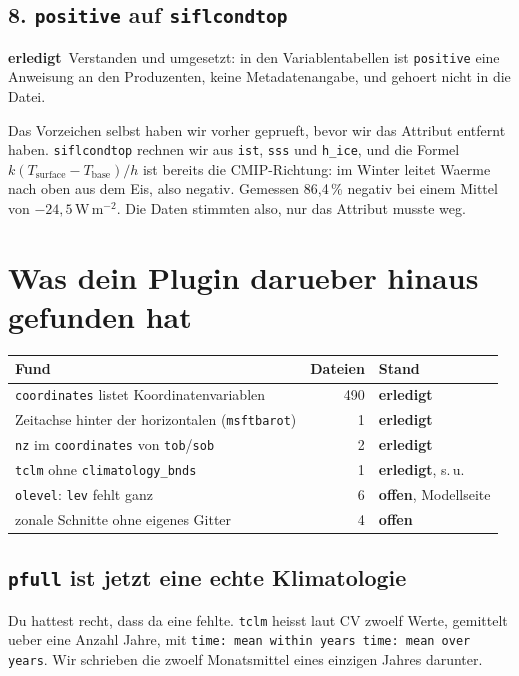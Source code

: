 \documentclass[11pt,a4paper]{article}
\newcommand{\code}[1]{\texttt{\small #1}}
\newcommand{\ok}{\textcolor{green!45!black}{\textbf{erledigt}}}
\newcommand{\offen}{\textcolor{orange!75!black}{\textbf{offen}}}
\begin{document}
\subsection*{8. \code{positive} auf \code{siflcondtop}}
\ok\ Verstanden und umgesetzt: in den Variablentabellen ist \code{positive} eine
Anweisung an den Produzenten, keine Metadatenangabe, und gehoert nicht in die Datei.

Das Vorzeichen selbst haben wir vorher geprueft, bevor wir das Attribut entfernt
haben. \code{siflcondtop} rechnen wir aus \code{ist}, \code{sss} und \code{h\_ice},
und die Formel $k(T_\mathrm{surface} - T_\mathrm{base})/h$ ist bereits die
CMIP-Richtung: im Winter leitet Waerme nach oben aus dem Eis, also negativ. Gemessen
86{,}4\,\% negativ bei einem Mittel von $-24{,}5$\,W\,m$^{-2}$. Die Daten stimmten
also, nur das Attribut musste weg.

\section{Was dein Plugin darueber hinaus gefunden hat}

\begin{center}
\begin{tabular}{lrl}
\toprule
\textbf{Fund} & \textbf{Dateien} & \textbf{Stand} \\
\midrule
\code{coordinates} listet Koordinatenvariablen & 490 & \ok \\
Zeitachse hinter der horizontalen (\code{msftbarot}) & 1 & \ok \\
\code{nz} im \code{coordinates} von \code{tob}/\code{sob} & 2 & \ok \\
\code{tclm} ohne \code{climatology\_bnds} & 1 & \ok, s.\,u. \\
\code{olevel}: \code{lev} fehlt ganz & 6 & \offen, Modellseite \\
zonale Schnitte ohne eigenes Gitter & 4 & \offen \\
\bottomrule
\end{tabular}
\end{center}

\subsection*{\code{pfull} ist jetzt eine echte Klimatologie}

Du hattest recht, dass da eine fehlte. \code{tclm} heisst laut CV zwoelf Werte,
gemittelt ueber eine Anzahl Jahre, mit \code{time: mean within years time: mean over
years}. Wir schrieben die zwoelf Monatsmittel eines einzigen Jahres darunter.
\end{document}

